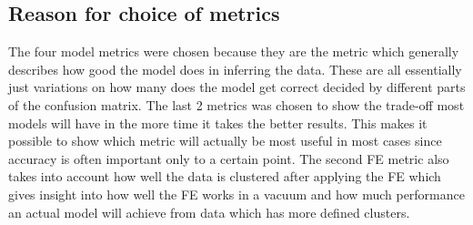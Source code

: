 \subsection{Reason for choice of metrics}
The four model metrics were chosen because they are the metric which generally describes how good the model does in inferring the data. These are all essentially just variations on
how many does the model get correct decided by different parts of the confusion matrix. The last 2 metrics was chosen to show the trade-off most models will have in the more time it takes the better results. This makes it possible to show which metric will actually be most useful in most cases since accuracy is often important only to a certain point. The second FE metric also takes into account how well the data is clustered after applying the FE which gives insight into how well the FE works in a vacuum and how much performance an actual model will achieve from data which has more defined clusters.
